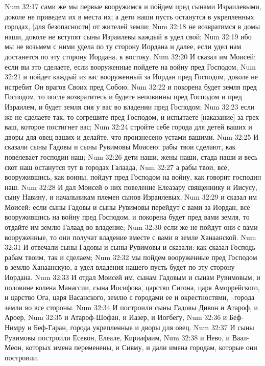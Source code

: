 Num 32:17  сами же мы первые вооружимся и пойдем пред сынами Израилевыми, доколе не приведем их в места их; а дети наши пусть останутся в укрепленных городах, [для безопасности] от жителей земли;
Num 32:18  не возвратимся в домы наши, доколе не вступят сыны Израилевы каждый в удел свой;
Num 32:19  ибо мы не возьмем с ними удела по ту сторону Иордана и далее, если удел нам достанется по эту сторону Иордана, к востоку.
Num 32:20  И сказал им Моисей: если вы это сделаете, если вооруженные пойдете на войну пред Господом,
Num 32:21  и пойдет каждый из вас вооруженный за Иордан пред Господом, доколе не истребит Он врагов Своих пред Собою,
Num 32:22  и покорена будет земля пред Господом, то после возвратитесь и будете неповинны пред Господом и пред Израилем, и будет земля сия у вас во владении пред Господом;
Num 32:23  если же не сделаете так, то согрешите пред Господом, и испытаете [наказание] за грех ваш, которое постигнет вас;
Num 32:24  стройте себе города для детей ваших и дворы для овец ваших и делайте, что произнесено устами вашими.
Num 32:25  И сказали сыны Гадовы и сыны Рувимовы Моисею: рабы твои сделают, как повелевает господин наш;
Num 32:26  дети наши, жены наши, стада наши и весь скот наш останутся тут в городах Галаада,
Num 32:27  а рабы твои, все, вооружившись, как воины, пойдут пред Господом на войну, как говорит господин наш.
Num 32:28  И дал Моисей о них повеление Елеазару священнику и Иисусу, сыну Навину, и начальникам племен сынов Израилевых,
Num 32:29  и сказал им Моисей: если сыны Гадовы и сыны Рувимовы перейдут с вами за Иордан, все вооружившись на войну пред Господом, и покорена будет пред вами земля, то отдайте им землю Галаад во владение;
Num 32:30  если же не пойдут они с вами вооруженные, то они получат владение вместе с вами в земле Ханаанской.
Num 32:31  И отвечали сыны Гадовы и сыны Рувимовы и сказали: как сказал Господь рабам твоим, так и сделаем;
Num 32:32  мы пойдем вооруженные пред Господом в землю Ханаанскую, а удел владения нашего пусть будет по эту сторону Иордана.
Num 32:33  И отдал Моисей им, сынам Гадовым и сынам Рувимовым, и половине колена Манассии, сына Иосифова, царство Сигона, царя Аморрейского, и царство Ога, царя Васанского, землю с городами ее и окрестностями, --города земли во все стороны.
Num 32:34  И построили сыны Гадовы Дивон и Атароф, и Ароер,
Num 32:35  и Атароф-Шофан, и Иазер, и Иогбегу,
Num 32:36  и Беф-Нимру и Беф-Гаран, города укрепленные и дворы для овец.
Num 32:37  И сыны Рувимовы построили Есевон, Елеале, Кириафаим,
Num 32:38  и Нево, и Ваал-Меон, которых имена переменены, и Сивму, и дали имена городам, которые они построили.
